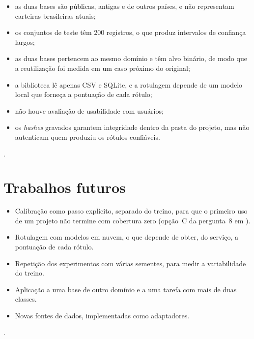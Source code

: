 \begin{itemize}
  \item as duas bases são públicas, antigas e de outros países, e não representam carteiras brasileiras atuais;
  \item os conjuntos de teste têm 200 registros, o que produz intervalos de confiança largos;
  \item as duas bases pertencem ao mesmo domínio e têm alvo binário, de modo que a reutilização foi medida em um caso próximo do original;
  \item a biblioteca lê apenas CSV e SQLite, e a rotulagem depende de um modelo local que forneça a pontuação de cada rótulo;
  \item não houve avaliação de usabilidade com usuários;
  \item os \emph{hashes} gravados garantem integridade dentro da pasta do projeto, mas não autenticam quem produziu os rótulos confiáveis.
\end{itemize}

.

\section{Trabalhos futuros}

\begin{itemize}
  \item Calibração como passo explícito, separado do treino, para que o primeiro uso de um projeto não termine com cobertura zero (opção~C da pergunta~8 em ).
  \item Rotulagem com modelos em nuvem, o que depende de obter, do serviço, a pontuação de cada rótulo.
  \item Repetição dos experimentos com várias sementes, para medir a variabilidade do treino.
  \item Aplicação a uma base de outro domínio e a uma tarefa com mais de duas classes.
  \item Novas fontes de dados, implementadas como adaptadores.
\end{itemize}

.
